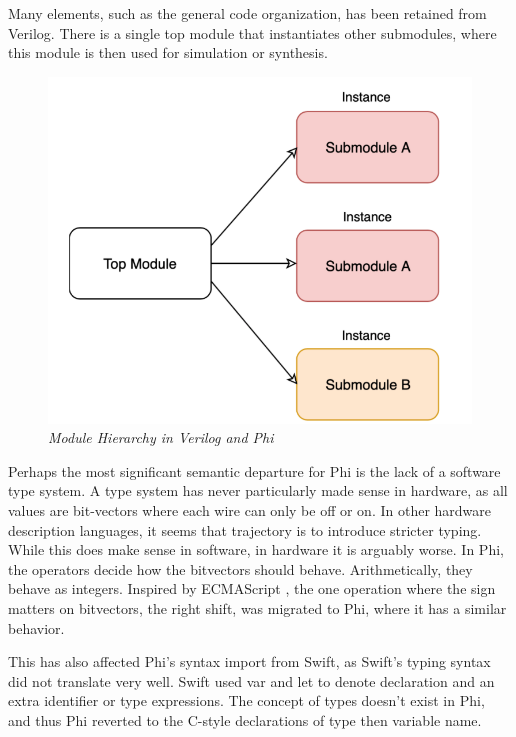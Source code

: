 \documentclass[10pt, two column]{article}
\theoremstyle{definition}
\begin{document}
Many elements, such as the general code organization, has been retained from Verilog. There is a single top module that instantiates other submodules, where this module is then used for simulation or synthesis.\newline 

\begin{figure}
  \includegraphics[width=\linewidth]{module_hierarchy.png}
  \caption{\textit{Module Hierarchy in Verilog and Phi}}
  \label{fig:module_hierarchy}
\end{figure}

Perhaps the most significant semantic departure for Phi is the lack of a software type system. A type system has never particularly made sense in hardware, as all values are bit-vectors where each wire can only be off or on. In other hardware description languages, it seems that trajectory is to introduce stricter typing. While this does make sense in software, in hardware it is arguably worse. In Phi, the operators decide how the bitvectors should behave. Arithmetically, they behave as integers. Inspired by ECMAScript \cite{ECMAScript_2018}, the one operation where the sign matters on bitvectors, the right shift, was migrated to Phi, where it has a similar behavior.\newline

This has also affected Phi’s syntax import from Swift, as Swift’s typing syntax did not translate very well. Swift used var and let to denote declaration and an extra identifier or type expressions. The concept of types doesn't exist in Phi, and thus Phi reverted to the C-style declarations of type then variable name.\newline 
\end{document}
